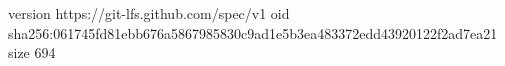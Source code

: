 version https://git-lfs.github.com/spec/v1
oid sha256:061745fd81ebb676a5867985830c9ad1e5b3ea483372edd43920122f2ad7ea21
size 694
